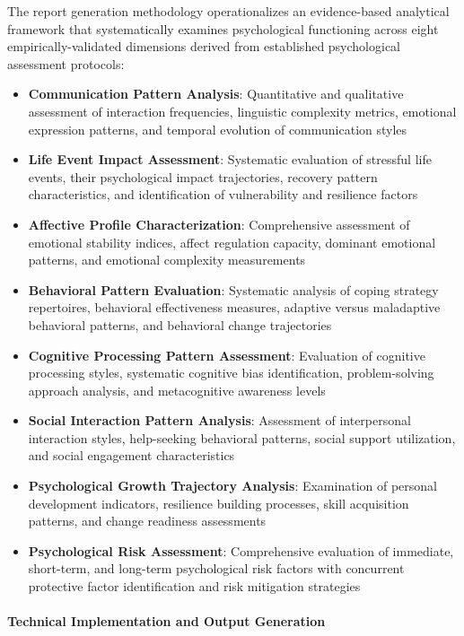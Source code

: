 The report generation methodology operationalizes an evidence-based analytical framework that systematically examines psychological functioning across eight empirically-validated dimensions derived from established psychological assessment protocols:

\begin{itemize}
\item \textbf{Communication Pattern Analysis}: Quantitative and qualitative assessment of interaction frequencies, linguistic complexity metrics, emotional expression patterns, and temporal evolution of communication styles
\item \textbf{Life Event Impact Assessment}: Systematic evaluation of stressful life events, their psychological impact trajectories, recovery pattern characteristics, and identification of vulnerability and resilience factors
\item \textbf{Affective Profile Characterization}: Comprehensive assessment of emotional stability indices, affect regulation capacity, dominant emotional patterns, and emotional complexity measurements
\item \textbf{Behavioral Pattern Evaluation}: Systematic analysis of coping strategy repertoires, behavioral effectiveness measures, adaptive versus maladaptive behavioral patterns, and behavioral change trajectories
\item \textbf{Cognitive Processing Pattern Assessment}: Evaluation of cognitive processing styles, systematic cognitive bias identification, problem-solving approach analysis, and metacognitive awareness levels
\item \textbf{Social Interaction Pattern Analysis}: Assessment of interpersonal interaction styles, help-seeking behavioral patterns, social support utilization, and social engagement characteristics
\item \textbf{Psychological Growth Trajectory Analysis}: Examination of personal development indicators, resilience building processes, skill acquisition patterns, and change readiness assessments
\item \textbf{Psychological Risk Assessment}: Comprehensive evaluation of immediate, short-term, and long-term psychological risk factors with concurrent protective factor identification and risk mitigation strategies
\end{itemize}

\paragraph{Technical Implementation and Output Generation}

